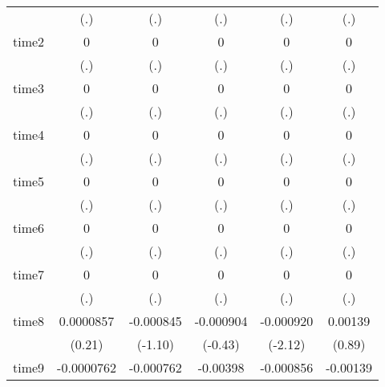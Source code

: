 \begin{table}[htbp]
\begin{tabular}{l*{5}{c}}
            &         (.)         &         (.)         &         (.)         &         (.)         &         (.)         \\
time2       &           0         &           0         &           0         &           0         &           0         \\
            &         (.)         &         (.)         &         (.)         &         (.)         &         (.)         \\
time3       &           0         &           0         &           0         &           0         &           0         \\
            &         (.)         &         (.)         &         (.)         &         (.)         &         (.)         \\
time4       &           0         &           0         &           0         &           0         &           0         \\
            &         (.)         &         (.)         &         (.)         &         (.)         &         (.)         \\
time5       &           0         &           0         &           0         &           0         &           0         \\
            &         (.)         &         (.)         &         (.)         &         (.)         &         (.)         \\
time6       &           0         &           0         &           0         &           0         &           0         \\
            &         (.)         &         (.)         &         (.)         &         (.)         &         (.)         \\
time7       &           0         &           0         &           0         &           0         &           0         \\
            &         (.)         &         (.)         &         (.)         &         (.)         &         (.)         \\
time8       &   0.0000857         &   -0.000845         &   -0.000904         &   -0.000920\sym{*}  &     0.00139         \\
            &      (0.21)         &     (-1.10)         &     (-0.43)         &     (-2.12)         &      (0.89)         \\
time9       &  -0.0000762         &   -0.000762         &    -0.00398         &   -0.000856         &    -0.00139         \\

\end{tabular}
\end{table}
